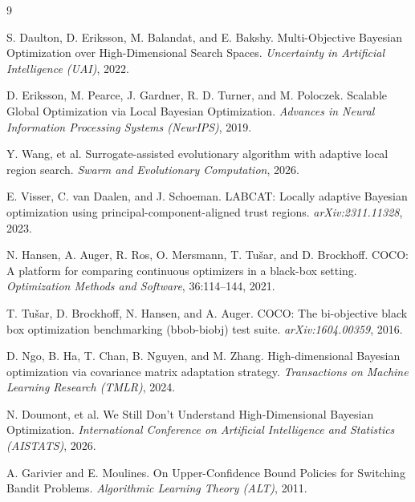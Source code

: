 \documentclass[11pt]{article}
\begin{document}

\begin{thebibliography}{9}

S. Daulton, D. Eriksson, M. Balandat, and E. Bakshy.
\newblock Multi-Objective Bayesian Optimization over High-Dimensional Search Spaces.
\newblock \emph{Uncertainty in Artificial Intelligence (UAI)}, 2022.

D. Eriksson, M. Pearce, J. Gardner, R. D. Turner, and M. Poloczek.
\newblock Scalable Global Optimization via Local Bayesian Optimization.
\newblock \emph{Advances in Neural Information Processing Systems (NeurIPS)}, 2019.

Y. Wang, et al.
\newblock Surrogate-assisted evolutionary algorithm with adaptive local region search.
\newblock \emph{Swarm and Evolutionary Computation}, 2026.

E. Visser, C. van Daalen, and J. Schoeman.
\newblock LABCAT: Locally adaptive Bayesian optimization using principal-component-aligned trust regions.
\newblock \emph{arXiv:2311.11328}, 2023.

N. Hansen, A. Auger, R. Ros, O. Mersmann, T. Tu\v{s}ar, and D. Brockhoff.
\newblock COCO: A platform for comparing continuous optimizers in a black-box setting.
\newblock \emph{Optimization Methods and Software}, 36:114--144, 2021.

T. Tu\v{s}ar, D. Brockhoff, N. Hansen, and A. Auger.
\newblock COCO: The bi-objective black box optimization benchmarking (bbob-biobj) test suite.
\newblock \emph{arXiv:1604.00359}, 2016.

D. Ngo, B. Ha, T. Chan, B. Nguyen, and M. Zhang.
\newblock High-dimensional Bayesian optimization via covariance matrix adaptation strategy.
\newblock \emph{Transactions on Machine Learning Research (TMLR)}, 2024.

N. Doumont, et al.
\newblock We Still Don't Understand High-Dimensional Bayesian Optimization.
\newblock \emph{International Conference on Artificial Intelligence and Statistics (AISTATS)}, 2026.

A. Garivier and E. Moulines.
\newblock On Upper-Confidence Bound Policies for Switching Bandit Problems.
\newblock \emph{Algorithmic Learning Theory (ALT)}, 2011.


\end{thebibliography}
\end{document}
